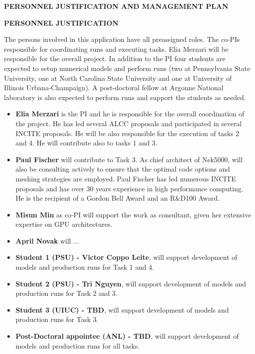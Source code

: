 \documentclass[11pt,letterpaper,english]{article}
\begin{document}
\setlength{\parindent}{0in} %

\pagestyle{fancy}   \renewcommand{%
\headrulewidth}{0.0pt}

\begin{center}
\bf {PERSONNEL JUSTIFICATION AND MANAGEMENT PLAN} \\
\end{center}

\vspace{-.25in}
\begin{flushleft}
{\noindent \bf  {PERSONNEL JUSTIFICATION}}

The persons involved in this application have all preassigned roles. The co-PIs responsible for coordinating runs and executing tasks. Elia Merzari will be responsible for the overall  project. In addition to the PI four students are expected to setup numerical models and perform runs (two at Pennsylvania State University, one at North Carolina State University and one at University of Illinois Urbana-Champaign). A post-doctoral fellow at Argonne National laboratory is also expected to perform runs and support the students as needed.

\vspace{-.15in}
\begin{itemize}
\item \textbf{Elia Merzari} is the PI and he is responsible for the overall coordination of the project. He has led several ALCC proposals and participated in several INCITE proposals. He will be also responsible for the execution of tasks 2 and 4. He will contribute also to tasks 1 and 3.
\item \textbf{Paul Fischer} will contribute to Task 3. As chief architect of Nek5000, will also be  consulting actively to ensure that the optimal code options and meshing strategies are employed. Paul Fischer has led numerous INCITE proposals and has over 30 years experience in high performance computing. He is the recipient of a Gordon Bell Award and an R\&D100 Award.
\item \textbf{Misun Min} as co-PI will support the work as consultant, given her extensive expertise on GPU architectures.
\item \textbf{April Novak} will ...
\item \textbf{Student 1 (PSU) - Victor Coppo Leite}, will support development of models and production runs for Task 1 and 4.
\item \textbf{Student 2 (PSU) - Tri Nguyen}, will support development of models and production runs for Task 2 and 3.
\item \textbf{Student 3 (UIUC) - TBD}, will support development of models and production runs for Task 3.
\item \textbf{Post-Doctoral appointee (ANL) - TBD}, will support development of models and production runs for all tasks.
\end{itemize}


\end{flushleft}
\end{document}
